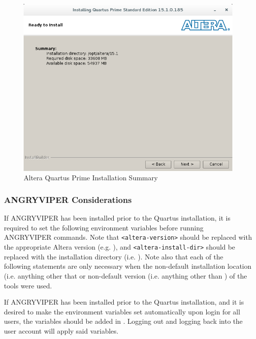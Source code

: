 \begin{flushleft}
\begin{enumerate}
\begin{figure}[H]
	\centerline{\includegraphics[scale=0.5]{figures/altera_install_6}}
	\caption{Altera Quartus Prime Installation Summary}
\end{figure}
\end{enumerate}


\subsubsection{ANGRYVIPER Considerations}
If ANGRYVIPER has been installed prior to the Quartus installation, it is required to set the following environment variables before running ANGRYVIPER commands. Note that \texttt{<altera-version>} should be replaced with the appropriate Altera version (e.g. ), and \texttt{<altera-install-dir>} should be replaced with the installation directory (i.e. ). Note also that each of the following  statements are only necessary when the non-default installation location (i.e. anything other that  or non-default version (i.e. anything other than ) of the tools were used.\newline
{}\newline
{}\newline
{}

If ANGRYVIPER has been installed prior to the Quartus installation, and it is desired to make the environment variables set automatically upon login for all users, the variables should be added in . Logging out and logging back into the user account will apply said variables.


\end{flushleft}

